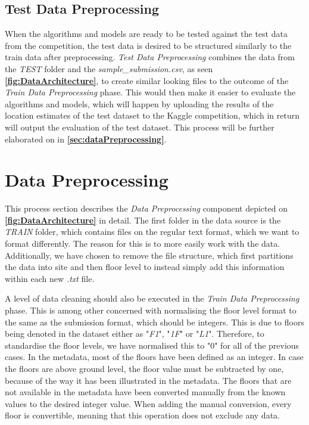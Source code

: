 \subsection{Test Data Preprocessing}
When the algorithms and models are ready to be tested against the test data from the competition, the test data is desired to be structured similarly to the train data after preprocessing. \textit{Test Data Preprocessing} combines the data from the \textit{TEST} folder and the \textit{sample\_submission.csv}, as seen \textbf{\autoref{fig:DataArchitecture}}, to create similar looking files to the outcome of the \textit{Train Data Preprocessing} phase. This would then make it easier to evaluate the algorithms and models, which will happen by uploading the results of the location estimates of the test dataset to the Kaggle competition, which in return will output the evaluation of the test dataset. This process will be further elaborated on in \textbf{\autoref{sec:dataPreprocessing}}.

\section{Data Preprocessing}
\label{sec:dataPreprocessing}
This process section describes the \textit{Data Preprocessing} component depicted on \textbf{\autoref{fig:DataArchitecture}} in detail. The first folder in the data source is the \textit{TRAIN} folder, which contains files on the regular text format, which we want to format differently. The reason for this is to more easily work with the data. Additionally, we have chosen to remove the file structure, which first partitions the data into site and then floor level to instead simply add this information within each new \textit{.txt} file.

A level of data cleaning should also be executed in the \textit{Train Data Preprocessing} phase. This is among other concerned with normalising the floor level format to the same as the submission format, which should be integers. This is due to floors being denoted in the dataset either as "\textit{F1}", "\textit{1F}" or "\textit{L1}". Therefore, to standardise the floor levels, we have normalised this to "0" for all of the previous cases. In the metadata, most of the floors have been defined as an integer. In case the floors are above ground level, the floor value must be subtracted by one, because of the way it has been illustrated in the metadata. The floors that are not available in the metadata have been converted manually from the known values to the desired integer value. When adding the manual conversion, every floor is convertible, meaning that this operation does not exclude any data.

